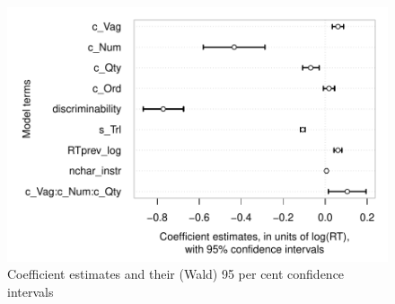 \documentclass[a4paper,12pt]{article}\usepackage[]{graphicx}\usepackage[]{color}
\makeatletter
\def\maxwidth{ %
  \ifdim\Gin@nat@width>\linewidth
    \linewidth
  \else
    \Gin@nat@width
  \fi
}
\newenvironment{knitrout}{}{} %
\makeatother
\begin{document}
\clearpage 

\begin{knitrout}\scriptsize
{}\color{fgcolor}\begin{figure}[hbtp]

{\centering \includegraphics[width=\maxwidth]{figure/graphics-plotModelCoefsAndCis-1} 

}

\caption[Coefficient estimates and their (Wald) 95 per cent confidence intervals]{Coefficient estimates and their (Wald) 95 per cent confidence intervals}\label{fig:plotModelCoefsAndCis}
\end{figure}


\end{knitrout}


\clearpage 
\end{document}
